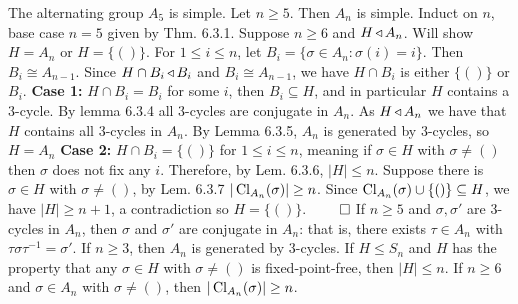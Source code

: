 The alternating group $A_5$ is simple.
 Let $n \ge 5$. Then $A_n$ is simple.
\wpf{} Induct on $n$, base case $n = 5$ given by Thm. 6.3.1. Suppose $n \ge 6$ and $H \operatorname{\triangleleft} A_n$. Will show $H = A_n$ or $H = \{()\}$. 
For $1 \le i \le n$, let $B_i = \{\sigma \in A_n : \sigma(i) = i\}.$ Then $B_i \cong A_{n-1}$. Since $H \cap B_i \operatorname{\triangleleft} B_i$ and $B_i \cong A_{n-1}$, we have $H \cap B_i$ is either $\{()\}$ or $B_i$.
\textbf{Case 1:} $H \cap B_i = B_i$ for some $i$, then $B_i \subseteq H$, and in particular $H$ contains a 3-cycle. By lemma 6.3.4 all 3-cycles are conjugate in $A_n$. As $H \operatorname{\triangleleft} A_n$ we have that $H$ contains all 3-cycles in $A_n$. By Lemma 6.3.5, $A_n$ is generated by 3-cycles, so $H = A_n$
\textbf{Case 2:} $H \cap B_i = \{()\}$ for $1 \le i \le n$, meaning if $\sigma \in H$ with $\sigma \ne ()$ then $\sigma$ does not fix any $i$. Therefore, by Lem. 6.3.6, $|H| \le n$. Suppose there is $\sigma \in H$ with $\sigma \ne ()$, by Lem. 6.3.7 $|\operatorname{Cl}_{A_n}(\sigma)| \ge n$. Since $\operatorname{Cl}_{A_n}(\sigma) \cup \{()\} \subseteq H$, we have $|H| \ge n+1$, a contradiction so $H = \{()\}$. $\qed$
 If $n \ge 5$ and $\sigma, \sigma'$ are 3-cycles in $A_n$, then $\sigma$ and $\sigma'$ are conjugate in $A_n$: that is, there exists $\tau \in A_n$ with $\tau \sigma \tau^{-1} = \sigma'$.
 If $n \ge 3$, then $A_n$ is generated by 3-cycles.
 If $H \le S_n$ and $H$ has the property that any $\sigma \in H$ with $\sigma \ne ()$ is fixed-point-free, then $|H| \le n$.
 If $n \ge 6$ and $\sigma \in A_n$ with $\sigma \ne ()$, then $|\operatorname{Cl}_{A_n}(\sigma)| \ge n$.